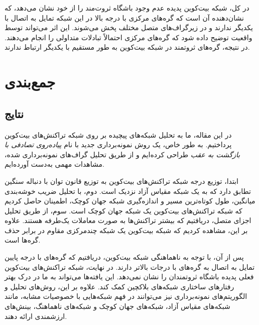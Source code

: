 در کل، شبکه بیت‌کوین پدیده عدم وجود باشگاه ثروت‌مند را از خود نشان می‌دهد، که نشان‌دهنده آن است که گره‌های مرکزی با درجه بالا در این شبکه تمایل به اتصال با یکدیگر ندارند و در زیرگراف‌های متصل مختلف پخش می‌شوند. این اثر می‌تواند توسط واقعیت توضیح داده شود که گره‌های مرکزی احتمالاً تبادلات متداولی را انجام می‌دهند. در نتیجه، گره‌های ثروتمند در شبکه بیت‌کوین به طور مستقیم با یکدیگر ارتباط ندارند.

\chapter{جمع‌بندی}
\section{نتایج}

در این مقاله، ما به تحلیل شبکه‌های پیچیده بر روی شبکه تراکنش‌های بیت‌کوین پرداختیم. به طور خاص، یک روش نمونه‌برداری جدید با نام \textit{پیاده‌روی تصادفی با بازگشت به عقب} طراحی کرده‌ایم و از طریق تحلیل گراف‌های نمونه‌برداری شده، مشاهدات مهمی به‌دست آورده‌ایم.

ابتدا، توزیع درجه شبکه تراکنش‌های بیت‌کوین به توزیع قانون توان با دنباله سنگین تطابق دارد که به یک شبکه مقیاس آزاد نزدیک است. دوم، با تحلیل ضریب خوشه‌بندی میانگین، طول کوتاه‌ترین مسیر و اندازه‌گیری شبکه جهان کوچک، اطمینان حاصل کردیم که شبکه تراکنش‌های بیت‌کوین یک شبکه جهان کوچک است. سوم، از طریق تحلیل اجزای متصل، دریافتیم که بیشتر تراکنش‌ها به صورت معاملات یک‌طرفه هستند. علاوه بر این، مشاهده کردیم که شبکه بیت‌کوین یک شبکه چندمرکزی مقاوم در برابر حذف گره‌ها است. 

پس از آن، با توجه به ناهماهنگی شبکه بیت‌کوین، دریافتیم که گره‌های با درجه پایین تمایل به اتصال به گره‌های با درجات بالاتر دارند. در نهایت، شبکه تراکنش‌های بیت‌کوین فعلی پدیده باشگاه ثروتمندان را نشان نمی‌دهد. این یافته‌ها می‌تواند به ما در درک بهتر رفتارهای ساختاری شبکه‌های بلاکچین کمک کند. علاوه بر این، روش‌های تحلیل و الگوریتم‌های نمونه‌برداری نیز می‌توانند در فهم شبکه‌هایی با خصوصیات مشابه، مانند شبکه‌های مقیاس آزاد، شبکه‌های جهان کوچک و شبکه‌های ناهماهنگ، بینش‌های ارزشمندی ارائه ‌دهند.
